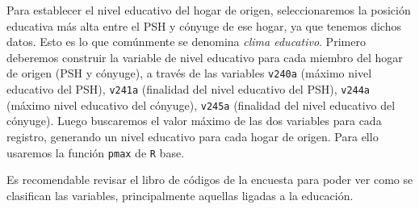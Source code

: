\documentclass[
]{article}
\begin{document}
Para establecer el nivel educativo del hogar de origen, seleccionaremos la posición educativa más alta entre el PSH y cónyuge de ese hogar, ya que tenemos dichos datos. Esto es lo que comúnmente se denomina \emph{clima educativo}. Primero deberemos construir la variable de nivel educativo para cada miembro del hogar de origen (PSH y cónyuge), a través de las variables \texttt{v240a} (máximo nivel educativo del PSH), \texttt{v241a} (finalidad del nivel educativo del PSH), \texttt{v244a} (máximo nivel educativo del cónyuge), \texttt{v245a} (finalidad del nivel educativo del cónyuge). Luego buscaremos el valor máximo de las dos variables para cada registro, generando un nivel educativo para cada hogar de origen. Para ello usaremos la función \texttt{pmax} de \texttt{R} base.

Es recomendable revisar el libro de códigos de la encuesta para poder ver como se clasifican las variables, principalmente aquellas ligadas a la educación.
\end{document}
